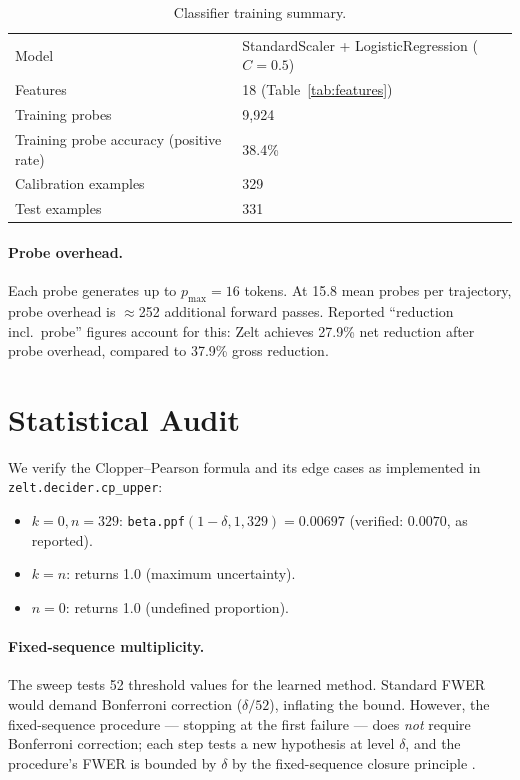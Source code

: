 \documentclass[11pt]{article}
\begin{document}
\begin{table}[h]
\centering
\caption{Classifier training summary.}
\label{tab:classifier}
\small
\begin{tabular}{ll}
\toprule
Model & StandardScaler + LogisticRegression ($C=0.5$) \\
Features & 18 (Table~\ref{tab:features}) \\
Training probes & 9{,}924 \\
Training probe accuracy (positive rate) & 38.4\% \\
Calibration examples & 329 \\
Test examples & 331 \\
\bottomrule
\end{tabular}
\end{table}

\paragraph{Probe overhead.}
Each probe generates up to $p_{\max}=16$ tokens.
At 15.8 mean probes per trajectory, probe overhead is $\approx$252
additional forward passes.
Reported ``reduction incl.\ probe'' figures account for this:
Zelt achieves 27.9\% net reduction after probe overhead,
compared to 37.9\% gross reduction.

\section{Statistical Audit}
\label{sec:audit}

We verify the Clopper--Pearson formula and its edge cases as implemented
in \texttt{zelt.decider.cp\_upper}:

\begin{itemize}
  \item $k=0, n=329$: \texttt{beta.ppf}$(1-\delta, 1, 329) = 0.00697$
        (verified: $0.0070$, as reported).
  \item $k=n$: returns 1.0 (maximum uncertainty).
  \item $n=0$: returns 1.0 (undefined proportion).
\end{itemize}

\paragraph{Fixed-sequence multiplicity.}
The sweep tests 52 threshold values for the learned method.
Standard FWER would demand Bonferroni correction ($\delta/52$),
inflating the bound.  However, the fixed-sequence procedure ---
stopping at the first failure --- does \emph{not} require Bonferroni
correction; each step tests a new hypothesis at level $\delta$,
and the procedure's FWER is bounded by $\delta$ by the fixed-sequence
closure principle \citep{angelopoulos2021learntest}.
\end{document}
